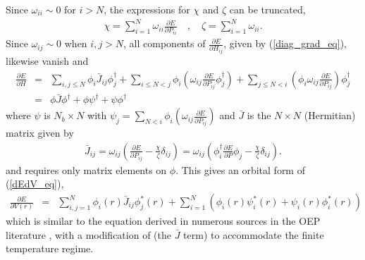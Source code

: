 \documentclass[12pt]{iopart}
\newcommand{\beas}{\begin{eqnarray*}}
\newcommand{\enas}{\end{eqnarray*}}
\newcommand{\bea}{\begin{eqnarray}} \newcommand{\ena}{\end{eqnarray}}
\newcommand{\dens}{P}
\begin{document}
Since $\omega_{ii} \sim 0$ for $i>N$, the expressions for $\chi$ and
$\zeta$ can be truncated,
\beas
\chi = \sum_{i=1}^{N} \omega_{ii} \frac{\partial E}{\partial \dens_{ii}}
\quad,
\quad
\zeta = \sum_{i=1}^{N} \omega_{ii}.
\enas
Since $\omega_{ij} \sim 0$ when $i,j > N$,
all components of $\frac{\partial E}{\partial H_{ij}}$,
given by (\ref{diag_grad_eq}),
likewise vanish and
\beas
\frac{\partial E}{\partial H}
&=& \sum_{i,j\le N} \phi_i \bar{J}_{ij} \phi_j^\dagger
+ \sum_{i\le N < j} \phi_i \left( \omega_{ij} \frac{\partial E}{\partial \dens_{ij}} \phi_j^\dagger \right) 
+ \sum_{j\le N < i} \left(\phi_i\omega_{ij} \frac{\partial E}{\partial \dens_{ij}}\right) \phi_j^\dagger \\
&=& \phi \bar{J} \phi^\dagger + \phi \psi^\dagger + \psi \phi^\dagger
\enas
where $\psi$ is $N_b \times N$ with
$\psi_{j} =
\sum_{N < i} \phi_i \left( \omega_{ij}  \frac{\partial E}{\partial \dens_{ij}}\right)
$
and $\bar{J}$ is the $N\times N$ (Hermitian) matrix given by
\beas
\bar{J}_{ij} =
 \omega_{ij}
   \left(\frac{\partial E}{\partial \dens_{ij}} - \frac{\chi}{\zeta}\delta_{ij}\right) =
 \omega_{ij}
   \left(\phi_{i}^\dagger \frac{\partial E}{\partial \dens}\phi_j
    - \frac{\chi}{\zeta}\delta_{ij}\right).
\enas
and requires only matrix elements on $\phi$.
This gives an orbital form of (\ref{dEdV_eq}),
\bea
\label{new_oep_eq}
\frac{\partial E}{\partial V(r)}
     &=& \sum_{i,j=1}^N \phi_i(r) \bar{J}_{ij} \phi_j^*(r)
         +\sum_{i=1}^N \left(\phi_i(r) \psi_i^*(r)+\psi_i(r) \phi_i^*(r)\right)
\ena
which is similar to the equation derived in numerous sources
in the OEP literature  \cite{HymanStilesZangwill:00,KummelPerdew:03},
with a modification of (the $\bar{J}$ term) to
accommodate the finite temperature regime.
\end{document}
